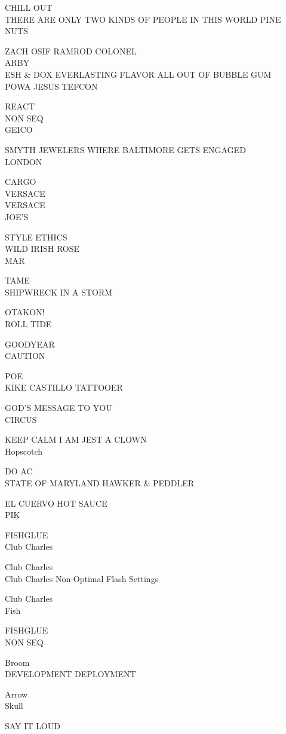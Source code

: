 \documentclass[10pt,letterpaper]{article}
\begin{document}
CHILL OUT\\
THERE ARE ONLY TWO KINDS OF PEOPLE IN THIS WORLD PINE NUTS

ZACH OSIF RAMROD COLONEL\\
ARBY\\
ESH \& DOX EVERLASTING FLAVOR ALL OUT OF BUBBLE GUM\\
POWA JESUS TEFCON

REACT\\
NON SEQ\\
GEICO

SMYTH JEWELERS WHERE BALTIMORE GETS ENGAGED\\
LONDON

CARGO\\
VERSACE\\
VERSACE\\
JOE'S

STYLE ETHICS\\
WILD IRISH ROSE\\
MAR

TAME\\
SHIPWRECK IN A STORM

OTAKON!\\
ROLL TIDE

GOODYEAR\\
CAUTION

POE\\
KIKE CASTILLO TATTOOER

GOD'S MESSAGE TO YOU\\
CIRCUS

KEEP CALM I AM JEST A CLOWN\\
Hopscotch

DO AC\\
STATE OF MARYLAND HAWKER \& PEDDLER

EL CUERVO HOT SAUCE\\
PIK

FISHGLUE\\
Club Charles

Club Charles\\
Club Charles Non{-}Optimal Flash Settings

Club Charles\\
Fish

FISHGLUE\\
NON SEQ

Broom\\
DEVELOPMENT DEPLOYMENT

Arrow\\
Skull

SAY IT LOUD
\end{document}
